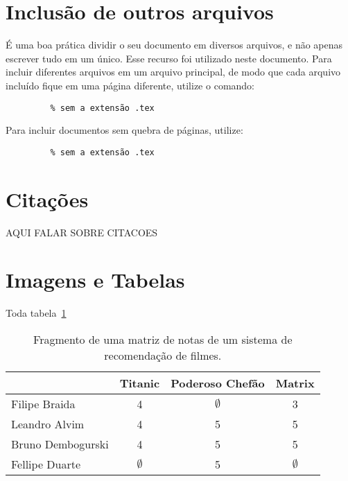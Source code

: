 \section{Inclusão de outros arquivos}

É uma boa prática dividir o seu documento em diversos arquivos, 
e não
apenas escrever tudo em um único. 
Esse recurso foi utilizado neste documento. 
Para incluir diferentes arquivos em um arquivo principal, 
de modo que cada arquivo incluído fique em uma página diferente, utilize o comando:

\begin{verbatim}
         % sem a extensão .tex
\end{verbatim}

Para incluir documentos sem quebra de páginas, utilize:

\begin{verbatim}
         % sem a extensão .tex
\end{verbatim}



\section{Citações}

AQUI FALAR SOBRE CITACOES

\section{Imagens e Tabelas}\label{sec:LABEL_CHP_2_SEC_A}

Toda tabela~\ref{tab:MATRIX_NOTAS_EXEMPLO}

\begin{table}[!htb]
  \centering
  \caption{Fragmento de uma matriz de notas de um sistema de recomendação de filmes.}
  \label{tab:MATRIX_NOTAS_EXEMPLO}
  \begin{tabular}{l c c c}
  \toprule
    & Titanic & Poderoso Chefão & Matrix \\
    \midrule
        Filipe Braida & 4 & $\emptyset$ & 3  \\
        Leandro Alvim & 4 & 5 & 5  \\
        Bruno Dembogurski & 4 & 5 & 5  \\
        Fellipe Duarte & $\emptyset$ & 5 & $\emptyset$  \\ 
    \bottomrule
  \end{tabular}
\end{table}

